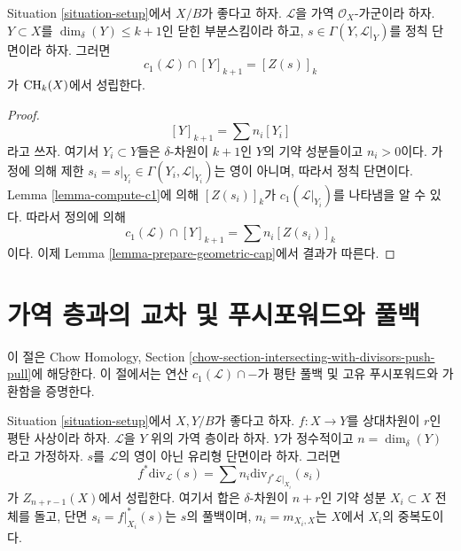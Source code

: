 \begin{lemma}
\label{lemma-geometric-cap}
Situation \ref{situation-setup}에서 $X/B$가 좋다고 하자.
$\mathcal{L}$을 가역 $\mathcal{O}_X$-가군이라 하자.
$Y \subset X$를 $\dim_\delta(Y) \leq k + 1$인 닫힌 부분스킴이라 하고,
$s \in \Gamma(Y, \mathcal{L}|_Y)$를 정칙 단면이라 하자. 그러면
$$
c_1(\mathcal{L}) \cap [Y]_{k + 1} = [Z(s)]_k
$$
가 $\mathop{\mathrm{CH}}\nolimits_k(X)$에서 성립한다.
\end{lemma}

\begin{proof}
$$
[Y]_{k + 1} = \sum n_i[Y_i]
$$
라고 쓰자. 여기서 $Y_i \subset Y$들은 $\delta$-차원이 $k + 1$인
$Y$의 기약 성분들이고 $n_i > 0$이다. 가정에 의해 제한
$s_i = s|_{Y_i} \in \Gamma(Y_i, \mathcal{L}|_{Y_i})$는 영이 아니며,
따라서 정칙 단면이다. Lemma \ref{lemma-compute-c1}에 의해
$[Z(s_i)]_k$가 $c_1(\mathcal{L}|_{Y_i})$를 나타냄을 알 수 있다.
따라서 정의에 의해
$$
c_1(\mathcal{L}) \cap [Y]_{k + 1} = \sum n_i[Z(s_i)]_k
$$
이다. 이제 Lemma \ref{lemma-prepare-geometric-cap}에서 결과가 따른다.
\end{proof}

\section{가역 층과의 교차 및 푸시포워드와 풀백}
\label{section-intersecting-with-divisors-push-pull}

\noindent
이 절은 Chow Homology, Section
\ref{chow-section-intersecting-with-divisors-push-pull}에 해당한다.
이 절에서는 연산 $c_1(\mathcal{L}) \cap -$가 평탄 풀백 및 고유
푸시포워드와 가환함을 증명한다.

\begin{lemma}
\label{lemma-prepare-flat-pullback-cap-c1}
Situation \ref{situation-setup}에서 $X, Y/B$가 좋다고 하자.
$f : X \to Y$를 상대차원이 $r$인 평탄 사상이라 하자.
$\mathcal{L}$을 $Y$ 위의 가역 층이라 하자.
$Y$가 정수적이고 $n = \dim_\delta(Y)$라고 가정하자.
$s$를 $\mathcal{L}$의 영이 아닌 유리형 단면이라 하자. 그러면
$$
f^*\text{div}_\mathcal{L}(s) = \sum n_i\text{div}_{f^*\mathcal{L}|_{X_i}}(s_i)
$$
가 $Z_{n + r - 1}(X)$에서 성립한다. 여기서 합은 $\delta$-차원이
$n + r$인 기약 성분 $X_i \subset X$ 전체를 돌고, 단면
$s_i = f|_{X_i}^*(s)$는 $s$의 풀백이며,
$n_i = m_{X_i, X}$는 $X$에서 $X_i$의 중복도이다.
\end{lemma}

